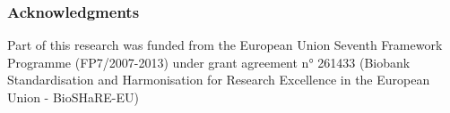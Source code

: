 \documentclass[runningheads,a4paper]{llncs}
\begin{document}
\subsubsection{Acknowledgments}
Part of this research was funded from the European Union Seventh Framework Programme (FP7/2007-2013) under grant agreement n° 261433 (Biobank Standardisation and Harmonisation for Research Excellence in the European Union - BioSHaRE-EU)



\end{document}
